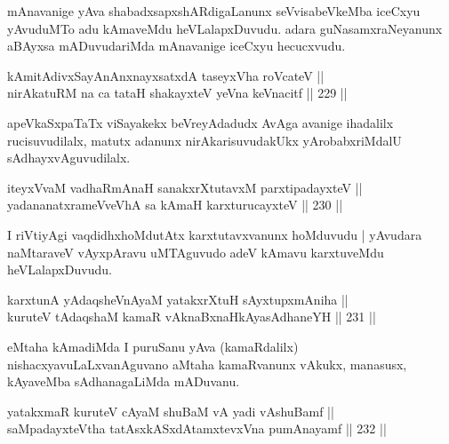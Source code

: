 \begin{artha}
mAnavanige yAva shabadxsapxshARdigaLanunx seVvisabeVkeMba iceCxyu
yAvuduMTo adu kAmaveMdu heVLalapxDuvudu. adara guNasamxraNeyanunx
aBAyxsa mADuvudariMda mAnavanige iceCxyu hecucxvudu.
\end{artha}

\begin{shl}
kAmitAdivxSayAnAnxnayxsatxdA taseyxVha roVcateV || \\
nirAkatuRM na ca tataH shakayxteV yeVna keVnacitf ||  229 ||  
\end{shl}

\begin{artha}
apeVkaSxpaTaTx viSayakekx beVreyAdadudx AvAga avanige ihadalilx
rucisuvudilalx, matutx adanunx nirAkarisuvudakUkx yArobabxriMdalU
sAdhayxvAguvudilalx.
\end{artha}

\begin{shl}
iteyxVvaM vadhaRmAnaH sana\footnotemark[1]kxrXtutavxM parxtipadayxteV || \\
yadananatxrameVveVhA sa kAmaH karxturucayxteV ||  230 ||  
\end{shl}

\begin{artha}
I riVtiyAgi vaqdidhxhoMdutAtx karxtutavxvanunx hoMduvudu | yAvudara
naMtaraveV vAyxpAravu uMTAguvudo adeV kAmavu karxtuveMdu heVLalapxDuvudu.
\end{artha}


\begin{shl}
karxtunA yAdaqsheVnAyaM yatakxrXtuH sAyxtupxmAniha || \\
kuruteV tAdaqshaM kamaR vAknaBxnaHkAyasAdhaneYH ||  231 || 
\end{shl}

\begin{artha}
eMtaha kAmadiMda I puruSanu yAva (kamaRdalilx)
nishacxyavuLaLxvanAguvano aMtaha kamaRvanunx vAkukx, manasusx,
kAyaveMba sAdhanagaLiMda mADuvanu.
\end{artha}

\begin{shl}
yatakxmaR kuruteV cAyaM shuBaM vA yadi vA\s shuBamf || \\
saMpadayxteV\s tha tatAsxkASxdAtamxtevxVna pumAnayamf ||  232 ||  
\end{shl}

